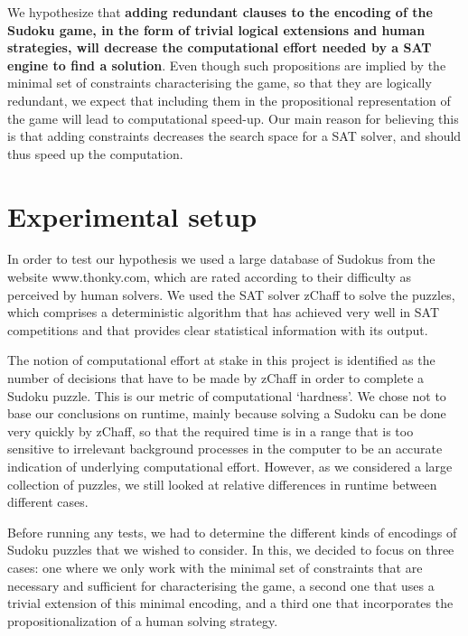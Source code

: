 \documentclass[10pt,a4paper,leqno]{article}
\begin{document}
We hypothesize that \textbf{adding redundant clauses to the encoding of the Sudoku game, in the form of trivial logical extensions and human strategies, will decrease the computational effort needed by a SAT engine to find a solution}. Even though such propositions are implied by the minimal set of constraints characterising the game, so that they are logically redundant, we expect that including them in the propositional representation of the game will lead to computational speed-up. Our main reason for believing this is that adding constraints decreases the search space for a SAT solver, and should thus speed up the computation. 

\section*{Experimental setup}

 
In order to test our hypothesis we used a large database of Sudokus from the website www.thonky.com, which are rated according to their difficulty as perceived by human solvers. We used the SAT solver zChaff to solve the puzzles, which comprises a deterministic algorithm that has achieved very well in SAT competitions and that provides clear statistical information with its output. 

The notion of computational effort at stake in this project is identified as the number of decisions that have to be made by zChaff in order to complete a Sudoku puzzle. This is our metric of computational `hardness'. We chose not to base our conclusions on runtime, mainly because solving a Sudoku can be done very quickly by zChaff, so that the required time is in a range that is too sensitive to irrelevant background processes in the computer to be an accurate indication of underlying computational effort. However, as we considered a large collection of puzzles, we still looked at relative differences in runtime between different cases. 

Before running any tests, we had to determine the different kinds of encodings of Sudoku puzzles that we wished to consider. In this, we decided to focus on three cases: one where we only work with the minimal set of constraints that are necessary and sufficient for characterising the game, a second one that uses a trivial extension of this minimal encoding, and a third one that incorporates the propositionalization of a human solving strategy. 
\end{document}

